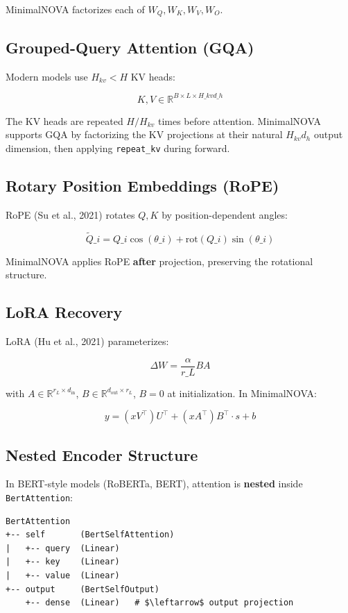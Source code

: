 MinimalNOVA factorizes each of $W_Q, W_K, W_V, W_O$.

\subsection{Grouped-Query Attention (GQA)}

Modern models use $H_{kv} < H$ KV heads:

\[
K, V \in \mathbb{R}^{B \times L \times H\_{kv} d\_h}
\tag{3.8}
\]

The KV heads are repeated $H/H_{kv}$ times before attention. MinimalNOVA 
supports GQA by factorizing the KV projections at their natural 
$H_{kv} d_h$ output dimension, then applying \texttt{repeat\_kv} during forward.

\subsection{Rotary Position Embeddings (RoPE)}

RoPE (Su et al., 2021) rotates $Q, K$ by position-dependent angles:

\[
\tilde{Q}\_i = Q\_i \cos(\theta\_i) + \text{rot}(Q\_i) \sin(\theta\_i)
\tag{3.9}
\]

MinimalNOVA applies RoPE \textbf{after} projection, preserving the rotational 
structure.

\subsection{LoRA Recovery}

LoRA (Hu et al., 2021) parameterizes:

\[
\Delta W = \frac{\alpha}{r\_L} B A
\tag{3.10}
\]

with $A \in \mathbb{R}^{r_L \times d_\text{in}}$, $B \in \mathbb{R}^{d_\text{out} \times r_L}$, 
$B = 0$ at initialization. In MinimalNOVA:

\[
y = (x V^\top) U^\top + (x A^\top) B^\top \cdot s + b
\tag{3.11}
\]

\subsection{Nested Encoder Structure}

In BERT-style models (RoBERTa, BERT), attention is \textbf{nested} inside 
\texttt{BertAttention}:

\begin{lstlisting}
BertAttention
+-- self       (BertSelfAttention)
|   +-- query  (Linear)
|   +-- key    (Linear)
|   +-- value  (Linear)
+-- output     (BertSelfOutput)
    +-- dense  (Linear)   # $\leftarrow$ output projection
\end{lstlisting}

